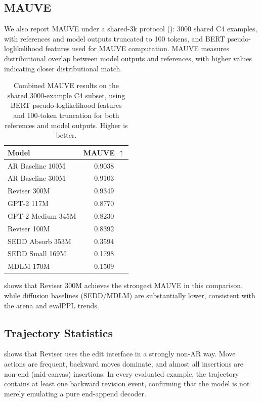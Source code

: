 \documentclass[11pt]{article}
\begin{document}
\subsection{MAUVE}
\label{sec:mauve}

We also report MAUVE under a shared-3k protocol (): 3000 shared C4 examples, with references and model outputs truncated to 100 tokens, and BERT pseudo-loglikelihood features used for MAUVE computation. MAUVE measures distributional overlap between model outputs and references, with higher values indicating closer distributional match.

\begin{table}[tbp]
\centering
\small
\setlength{\tabcolsep}{7pt}
\begin{tabular}{lc}
\toprule
Model & MAUVE $\uparrow$ \\
\midrule
AR Baseline 100M & \num{0.9038} \\
AR Baseline 300M & \num{0.9103} \\
\midrule
Reviser 300M & \num{0.9349} \\
GPT-2 117M & \num{0.8770} \\
GPT-2 Medium 345M & \num{0.8230} \\
Reviser 100M & \num{0.8392} \\
\midrule
SEDD Absorb 353M & \num{0.3594} \\
SEDD Small 169M & \num{0.1798} \\
MDLM 170M & \num{0.1509} \\
\bottomrule
\end{tabular}
\caption{Combined MAUVE results on the shared 3000-example C4 subset, using BERT pseudo-loglikelihood features and 100-token truncation for both references and model outputs. Higher is better.}
\label{tab:mauve_all}
\end{table}

 shows that Reviser 300M achieves the strongest MAUVE in this comparison, while diffusion baselines (SEDD/MDLM) are substantially lower, consistent with the arena and evalPPL trends.

\subsection{Trajectory Statistics}
\label{sec:trajectory_stats}

 shows that Reviser uses the edit interface in a strongly non-AR way. Move actions are frequent, backward moves dominate, and almost all insertions are non-end (mid-canvas) insertions. In every evaluated example, the trajectory contains at least one backward revision event, confirming that the model is not merely emulating a pure end-append decoder.
\end{document}
